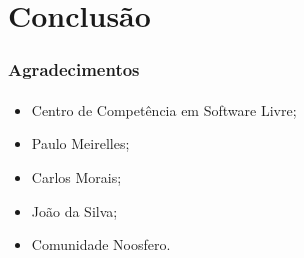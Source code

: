\documentclass{beamer}
\begin{document}
  \section{Conclusão}

  \begin{frame}
    \frametitle{Agradecimentos}
    \framesubtitle{}

    \begin{itemize}
      \item Centro de Competência em Software Livre;
      \item Paulo Meirelles;
      \item Carlos Morais;
      \item João da Silva;
      \item Comunidade Noosfero.
    \end{itemize}
  \end{frame}
\end{document}
